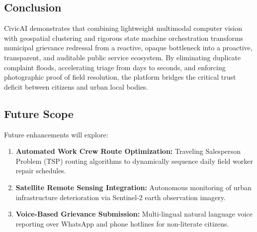 \documentclass[11pt,a4paper]{article}
\begin{document}
\subsection{Conclusion}
CivicAI demonstrates that combining lightweight multimodal computer vision with geospatial clustering and rigorous state machine orchestration transforms municipal grievance redressal from a reactive, opaque bottleneck into a proactive, transparent, and auditable public service ecosystem. By eliminating duplicate complaint floods, accelerating triage from days to seconds, and enforcing photographic proof of field resolution, the platform bridges the critical trust deficit between citizens and urban local bodies.

\subsection{Future Scope}
Future enhancements will explore:
\begin{enumerate}[leftmargin=1.5em]
    \item \textbf{Automated Work Crew Route Optimization:} Traveling Salesperson Problem (TSP) routing algorithms to dynamically sequence daily field worker repair schedules.
    \item \textbf{Satellite Remote Sensing Integration:} Autonomous monitoring of urban infrastructure deterioration via Sentinel-2 earth observation imagery.
    \item \textbf{Voice-Based Grievance Submission:} Multi-lingual natural language voice reporting over WhatsApp and phone hotlines for non-literate citizens.
\end{enumerate}
\end{document}

